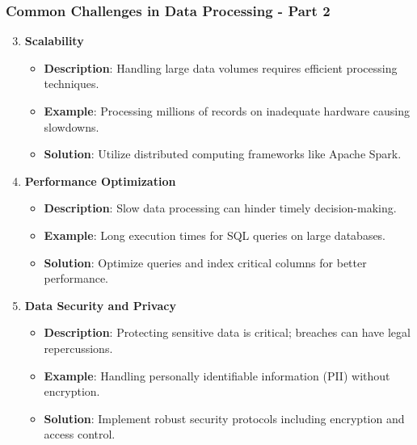 \documentclass[aspectratio=169]{beamer}
\begin{document}
\begin{frame}[fragile]
    \frametitle{Common Challenges in Data Processing - Part 2}
    \begin{enumerate}
        \setcounter{enumi}{2} %
        \item \textbf{Scalability}
            \begin{itemize}
                \item \textbf{Description}: Handling large data volumes requires efficient processing techniques.
                \item \textbf{Example}: Processing millions of records on inadequate hardware causing slowdowns.
                \item \textbf{Solution}: Utilize distributed computing frameworks like Apache Spark.
            \end{itemize}

        \item \textbf{Performance Optimization}
            \begin{itemize}
                \item \textbf{Description}: Slow data processing can hinder timely decision-making.
                \item \textbf{Example}: Long execution times for SQL queries on large databases.
                \item \textbf{Solution}: Optimize queries and index critical columns for better performance.
            \end{itemize}

        \item \textbf{Data Security and Privacy}
            \begin{itemize}
                \item \textbf{Description}: Protecting sensitive data is critical; breaches can have legal repercussions.
                \item \textbf{Example}: Handling personally identifiable information (PII) without encryption.
                \item \textbf{Solution}: Implement robust security protocols including encryption and access control.
            \end{itemize}
    \end{enumerate}
\end{frame}
\end{document}
